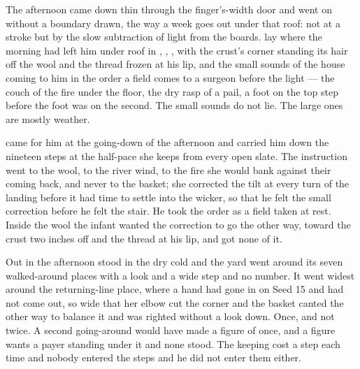 The afternoon came down thin through the finger's-width door and went on without a boundary drawn, the way a week goes out under that roof: not at a stroke but by the slow subtraction of light from the boards.  lay where the morning had left him under  roof in , , , with the crust's corner standing its hair off the wool and the thread frozen at his lip, and the small sounds of the house coming to him in the order a field comes to a surgeon before the light --- the couch of the fire under the floor, the dry rasp of a pail, a foot on the top step before the foot was on the second. The small sounds do not lie. The large ones are mostly weather.

 came for him at the going-down of the afternoon and carried him down the nineteen steps at the half-pace she keeps from every open slate. The instruction went to the wool, to the river wind, to the fire she would bank against their coming back, and never to the basket; she corrected the tilt at every turn of the landing before it had time to settle into the wicker, so that he felt the small correction before he felt the stair. He took the order as a field taken at rest. Inside the wool the infant wanted the correction to go the other way, toward the crust two inches off and the thread at his lip, and got none of it.

Out in  the afternoon stood in the dry cold and the yard went around its seven walked-around places with a look and a wide step and no number. It went widest around the returning-line place, where a hand had gone in on Seed 15 and had not come out, so wide that her elbow cut the corner and the basket canted the other way to balance it and was righted without a look down. Once, and not twice. A second going-around would have made a figure of once, and a figure wants a payer standing under it and none stood. The keeping cost a step each time and nobody entered the steps and he did not enter them either.

